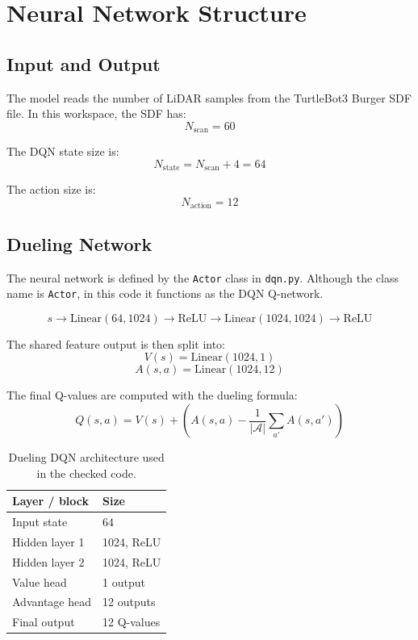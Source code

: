 \documentclass[11pt,a4paper]{article}
\begin{document}
\section{Neural Network Structure}

\subsection{Input and Output}

The model reads the number of LiDAR samples from the TurtleBot3 Burger SDF file. In this workspace, the SDF has:
\[
    N_{\text{scan}} = 60
\]

The DQN state size is:
\[
    N_{\text{state}} = N_{\text{scan}} + 4 = 64
\]

The action size is:
\[
    N_{\text{action}} = 12
\]

\subsection{Dueling Network}

The neural network is defined by the \texttt{Actor} class in \texttt{dqn.py}. Although the class name is \texttt{Actor}, in this code it functions as the DQN Q-network.

\[
    s \rightarrow \text{Linear}(64, 1024) \rightarrow \text{ReLU}
      \rightarrow \text{Linear}(1024, 1024) \rightarrow \text{ReLU}
\]

The shared feature output is then split into:
\[
    V(s) = \text{Linear}(1024, 1)
\]
\[
    A(s,a) = \text{Linear}(1024, 12)
\]

The final Q-values are computed with the dueling formula:
\[
    Q(s,a) = V(s) + \left(A(s,a) - \frac{1}{|\mathcal{A}|}\sum_{a'} A(s,a')\right)
\]

\begin{table}[h]
\centering
\begin{tabular}{ll}
\toprule
\textbf{Layer / block} & \textbf{Size} \\
\midrule
Input state & 64 \\
Hidden layer 1 & 1024, ReLU \\
Hidden layer 2 & 1024, ReLU \\
Value head & 1 output \\
Advantage head & 12 outputs \\
Final output & 12 Q-values \\
\bottomrule
\end{tabular}
\caption{Dueling DQN architecture used in the checked code.}
\end{table}
\end{document}
